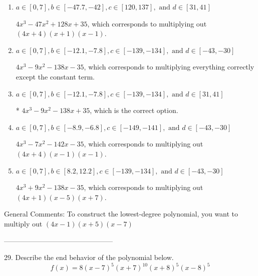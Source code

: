 \documentclass{article}[14pt]
\begin{document}
\begin{enumerate}[label=\Alph*.] 
\item $ a \in [0, 7], b \in [-47.7, -42], c \in [120, 137], \text{ and } d \in [31, 41] $ 

 $4x^{3} -47 x^{2} +128 x + 35$, which corresponds to multiplying out $(4x + 4)(x + 1)(x -1)$. 
\item $ a \in [0, 7], b \in [-12.1, -7.8], c \in [-139, -134], \text{ and } d \in [-43, -30] $ 

 $4x^{3} -9 x^{2} -138 x -35$, which corresponds to multiplying everything correctly except the constant term. 
\item $ a \in [0, 7], b \in [-12.1, -7.8], c \in [-139, -134], \text{ and } d \in [31, 41] $ 

 * $4x^{3} -9 x^{2} -138 x + 35$, which is the correct option. 
\item $ a \in [0, 7], b \in [-8.9, -6.8], c \in [-149, -141], \text{ and } d \in [-43, -30] $ 

 $4x^{3} -7 x^{2} -142 x -35$, which corresponds to multiplying out $(4x + 4)(x -1)(x -1)$. 
\item $ a \in [0, 7], b \in [8.2, 12.2], c \in [-139, -134], \text{ and } d \in [-43, -30] $ 

 $4x^{3} +9 x^{2} -138 x -35$, which corresponds to multiplying out $(4x + 1)(x -5)(x + 7)$. 
\end{enumerate} 
 
General Comments: To construct the lowest-degree polynomial, you want to multiply out $(4x -1)(x + 5)(x -7)$

-----------------------------------------------

29. Describe the end behavior of the polynomial below.
$$ f(x) = 8(x - 7)^{5}(x + 7)^{10}(x + 8)^{5}(x - 8)^{5} $$ 
\end{document}
